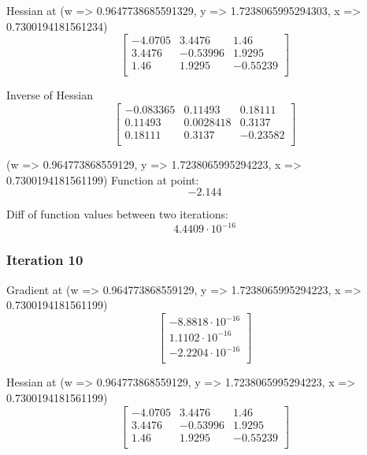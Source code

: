 \documentclass{article}
\begin{document}
Hessian at (w => 0.9647738685591329, y => 1.7238065995294303, x => 0.7300194181561234)
\begin{equation}
\left[
\begin{array}{ccc}
-4.0705 & 3.4476 & 1.46 \\
3.4476 & -0.53996 & 1.9295 \\
1.46 & 1.9295 & -0.55239 \\
\end{array}
\right]
\end{equation}

Inverse of Hessian
\begin{equation}
\left[
\begin{array}{ccc}
-0.083365 & 0.11493 & 0.18111 \\
0.11493 & 0.0028418 & 0.3137 \\
0.18111 & 0.3137 & -0.23582 \\
\end{array}
\right]
\end{equation}

(w => 0.964773868559129, y => 1.7238065995294223, x => 0.7300194181561199)
Function at point:
\begin{equation}
-2.144
\end{equation}

Diff of function values between two iterations:
\begin{equation}
4.4409 \cdot 10^{-16}
\end{equation}

\subsubsection{Iteration 10}
Gradient at (w => 0.964773868559129, y => 1.7238065995294223, x => 0.7300194181561199)
\begin{equation}
\left[
\begin{array}{c}
-8.8818 \cdot 10^{-16} \\
1.1102 \cdot 10^{-16} \\
-2.2204 \cdot 10^{-16} \\
\end{array}
\right]
\end{equation}

Hessian at (w => 0.964773868559129, y => 1.7238065995294223, x => 0.7300194181561199)
\begin{equation}
\left[
\begin{array}{ccc}
-4.0705 & 3.4476 & 1.46 \\
3.4476 & -0.53996 & 1.9295 \\
1.46 & 1.9295 & -0.55239 \\
\end{array}
\right]
\end{equation}
\end{document}
